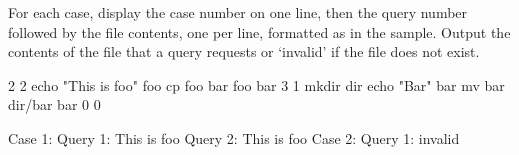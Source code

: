 \documentclass{article}
\begin{document}
\begin{outputDescription}
For each case, display the case number on one line, then the query number followed by 
the file contents, one per line, formatted as in the sample. Output the contents of 
the file that a query requests or `invalid' if the file does not exist.
\end{outputDescription}

\begin{sampleInput}
2  2
echo "This is foo" foo
cp foo bar
foo
bar
3  1
mkdir dir
echo "Bar" bar
mv bar dir/bar
bar
0  0
\end{sampleInput}
\begin{sampleOutput}
Case 1:
Query 1: This is foo
Query 2: This is foo
Case 2:
Query 1: invalid
\end{sampleOutput}
\end{document}

